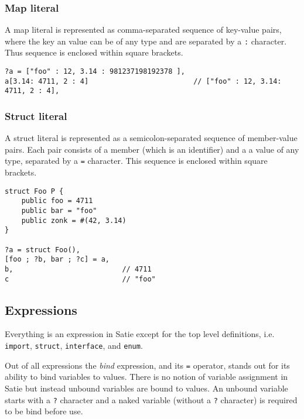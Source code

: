 \hypertarget{map-literal}{%
\subsubsection{Map literal}\label{map-literal}}

A map literal is represented as comma-separated sequence of key-value
pairs, where the key an value can be of any type and are separated by a
\texttt{:} character. Thus sequence is enclosed within square brackets.

\begin{verbatim}
?a = ["foo" : 12, 3.14 : 981237198192378 ],
a[3.14: 4711, 2 : 4]                         // ["foo" : 12, 3.14: 4711, 2 : 4],
\end{verbatim}

\hypertarget{struct-literal}{%
\subsubsection{Struct literal}\label{struct-literal}}

A struct literal is represented as a semicolon-separated sequence of
member-value pairs. Each pair consists of a member (which is an
identifier) and a a value of any type, separated by a \texttt{=}
character. This sequence is enclosed within square brackets.

\begin{verbatim}
struct Foo P {
    public foo = 4711
    public bar = "foo"
    public zonk = #(42, 3.14)
}

?a = struct Foo(),
[foo ; ?b, bar ; ?c] = a,
b,                          // 4711
c                           // "foo"
\end{verbatim}

\hypertarget{expressions}{%
\subsection{Expressions}\label{expressions}}

Everything is an expression in Satie except for the top level
definitions, i.e. \texttt{import}, \texttt{struct}, \texttt{interface},
and \texttt{enum}.

Out of all expressions the \emph{bind} expression, and its \texttt{=}
operator, stands out for its ability to bind variables to values. There
is no notion of variable assignment in Satie but instead unbound
variables are bound to values. An unbound variable starts with a
\texttt{?} character and a naked variable (without a \texttt{?}
character) is required to be bind before use.

